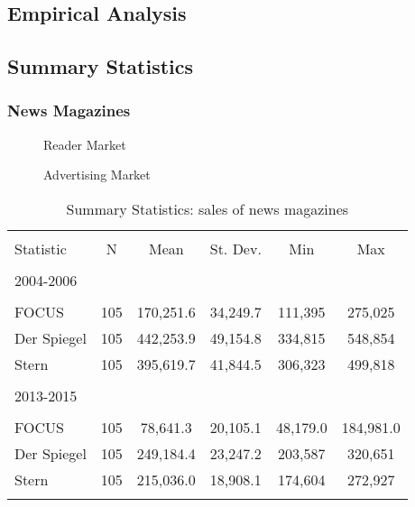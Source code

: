 \documentclass[12pt,a4paper]{scrreprt}
\begin{document}
\begin{appendices}
\chapter{Empirical Analysis}

\section{Summary Statistics}

\subsection{News Magazines}  \label{appendix_sum_fss} 

\begin{figure}[H]
\caption{Reader Market}
\begin{minipage}
	\centering
	
\end{minipage}
\hfil
\begin{minipage}
	\centering
	
\end{minipage}
\end{figure}

\begin{figure}[H]
\caption{Advertising Market}
\begin{minipage}
	\centering
	
\end{minipage}
\hfil
\begin{minipage}
	\centering
	
\end{minipage}
\end{figure}

\begin{table}[!htbp] \centering 
  \caption{Summary Statistics: sales of news magazines} 
\begin{tabular}{@{\extracolsep{5pt}}lccccc} 
\\[-1.8ex]\hline 
\hline \\[-1.8ex] 
Statistic & \multicolumn{1}{c}{N} & \multicolumn{1}{c}{Mean} & \multicolumn{1}{c}{St. Dev.} & \multicolumn{1}{c}{Min} & \multicolumn{1}{c}{Max} \\ 
\hline \\[-1.8ex] 
2004-2006 \\
\hline \\[-1.8ex] 
FOCUS & 105 & 170,251.6 & 34,249.7 & 111,395 & 275,025 \\ 
Der Spiegel & 105 & 442,253.9 & 49,154.8 & 334,815 & 548,854 \\ 
Stern & 105 & 395,619.7 & 41,844.5 & 306,323 & 499,818 \\ 
\hline \\[-1.8ex] 
2013-2015 \\
\hline \\[-1.8ex] 
FOCUS & 105 & 78,641.3 & 20,105.1 & 48,179.0 & 184,981.0 \\ 
Der Spiegel & 105 & 249,184.4 & 23,247.2 & 203,587 & 320,651 \\ 
Stern & 105 & 215,036.0 & 18,908.1 & 174,604 & 272,927 \\  
\hline \\[-1.8ex] 
\end{tabular} 
\end{table} 


\end{appendices}
\end{document}

